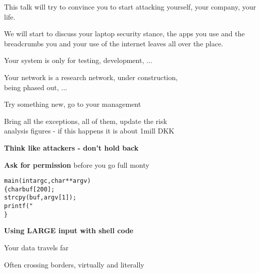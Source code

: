 \documentclass[Screen16to9,17pt,footrule]{foils}
\begin{document}
\begin{list2}
\item This talk will try to convince you to start attacking yourself, your company, your life.
\item We will start to discuss your laptop security stance, the apps you use and the breadcrumbs you and your use of the internet leaves all over the place.
\end{list2}



Your system is only for testing, development, ...

Your network is a research network, under construction, \\
being phased out, ...

Try something new, go to your management

Bring all the exceptions, all of them, update the risk \\
analysis figures - if this happens it is about 1mill DKK



{\bf Think like attackers - don't hold back}

\vskip 5mm
{\bf Ask for permission} before you go full monty



\begin{alltt}
main(int argc, char **argv)
\{      char buf[200];
        strcpy(buf, argv[1]);
        printf("%s\textbackslash{}n",buf);
\}
\end{alltt}





\centerline{\bf\Large Using LARGE input with shell code}



\begin{list2}
\item Your data travels far
\item Often crossing borders, virtually and literally
\end{list2}
\end{document}
